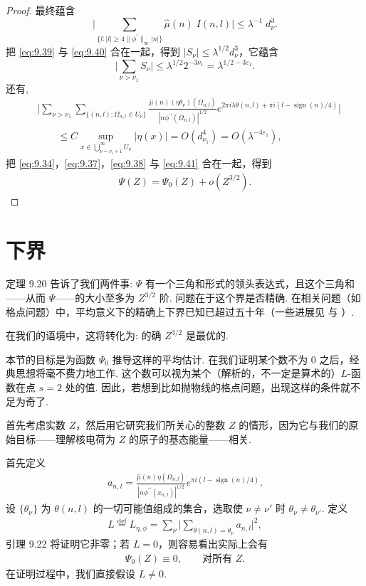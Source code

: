 \begin{proof}
最终蕴含
\begin{equation}\label{eq:9.40}
  \Big|\sum_{\{l:|l|\geq 4\|\phi^{\prime}\|_{\infty}|n|\}}\hat{\mu}(n)\;I(n,l)\Big|
  \leq\lambda^{-1}\;d_{\nu}^{3}.
\end{equation}
把 \eqref{eq:9.39} 与 \eqref{eq:9.40} 合在一起，得到 $|S_\nu| \leq \lambda^{1/2}d_\nu^3$，它蕴含
\begin{equation}\label{eq:9.41}
  \Big|\sum_{\nu>\nu_{1}}S_{\nu}\Big|\leq\lambda^{1/2}2^{-3\nu_{1}}
  =\lambda^{1/2-3\varepsilon_{1}}.
\end{equation}
还有,
\begin{align*}
  &\Big|\sum_{\nu>\nu_{1}}\sum_{\{(n,l):\Omega_{n,l}\in U_\nu\}}
   \frac{\hat{\mu}(n)(\eta\theta_\nu)(\Omega_{n,l})}{|n\phi^{\prime\prime}(\Omega_{n,l})|^{1/2}}
   e^{2\pi i\lambda\theta(n,l)+\pi i(l-\operatorname{sign}(n)/4)}\Big|\\
  &\qquad\leq C\sup_{x\in\bigcup_{\nu=\nu_{1}+1}^{\infty}U_\nu}|\eta(x)|
  =O(d_{\nu_{1}}^{4})=O(\lambda^{-4\varepsilon_{1}}),
\end{align*}
把 \eqref{eq:9.34}，\eqref{eq:9.37}，\eqref{eq:9.38} 与 \eqref{eq:9.41} 合在一起，得到
\begin{align*}
  \Psi(Z)=\Psi_{0}(Z)+o(Z^{3/2}).
\end{align*}
\end{proof}

\section{下界}

定理 9.20 告诉了我们两件事: $\Psi$ 有一个三角和形式的领头表达式，且这个三角和——从而 $\Psi$——的大小至多为 $Z^{3/2}$ 阶. 问题在于这个界是否精确. 在相关问题（如格点问题）中，平均意义下的精确上下界已知已超过五十年（一些进展见 \cite{b198} 与 \cite{b217}）.

在我们的语境中，这将转化为: 的确 $Z^{3/2}$ 是最优的.

本节的目标是为函数 $\Psi_0$ 推导这样的平均估计. 在我们证明某个数不为 $0$ 之后，经典思想将毫不费力地工作. 这个数可以视为某个（解析的，不一定是算术的）$L$-函数在点 $s = 2$ 处的值. 因此，若想到比如抛物线的格点问题，出现这样的条件就不足为奇了.

首先考虑实数 $Z$，然后用它研究我们所关心的整数 $Z$ 的情形，因为它与我们的原始目标——理解核电荷为 $Z$ 的原子的基态能量——相关.

首先定义
\begin{align*}
  a_{n,l}=\frac{\hat{\mu}(n)\eta(\Omega_{n,l})}{|n\phi^{\prime\prime}(x_{n,l})|^{1/2}}e^{\pi i(l-\operatorname{sign}(n)/4)}.
\end{align*}
设 $\{\theta_\nu\}$ 为 $\theta(n,l)$ 的一切可能值组成的集合，选取使 $\nu \neq \nu'$ 时 $\theta_\nu \neq \theta_{\nu'}$. 定义
\begin{align*}
  L\stackrel{\mathrm{def}}{=}L_{\eta,\phi}=\sum_{\nu}\Big|\sum_{\theta(n,l)=\theta_{\nu}}a_{n,l}\Big|^{2},
\end{align*}
引理 9.22 将证明它非零；若 $L = 0$，则容易看出实际上会有
\begin{align*}
  \Psi_{0}(Z)\equiv 0,\qquad \text{对所有 } Z.
\end{align*}
在证明过程中，我们直接假设 $L \neq 0$.

